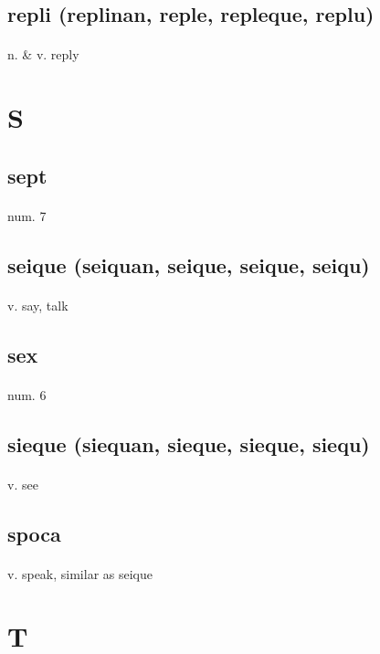 \documentclass[UTF8]{article}
\begin{document}
    \subsection{repli (replinan, reple, repleque, replu)}
    \paragraph{} n. \& v. reply 
    \newpage \section{S}
    \subsection{sept}
    \paragraph{} num. 7 
    \subsection{seique (seiquan, seique, seique, seiqu)}
    \paragraph{} v. say, talk 
    \subsection{sex}
    \paragraph{} num. 6 
    \subsection{sieque (siequan, sieque, sieque, siequ)}
    \paragraph{} v. see 
    \subsection{spoca}
    \paragraph{} v. speak, similar as seique 
    \newpage \section{T}
\end{document}
